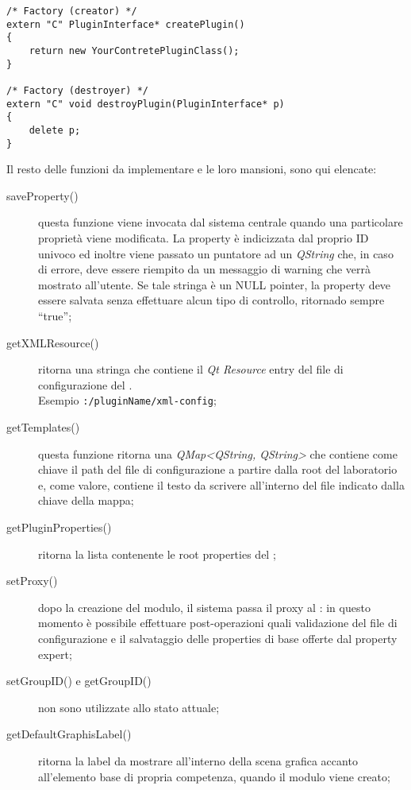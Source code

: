 \begin{lstlisting}
/* Factory (creator) */
extern "C" PluginInterface* createPlugin()
{
	return new YourContretePluginClass();
}

/* Factory (destroyer) */
extern "C" void destroyPlugin(PluginInterface* p)
{
	delete p;
}
\end{lstlisting}
Il resto delle funzioni da implementare e le loro mansioni, sono qui elencate:
\begin{description}
\item[saveProperty()] questa funzione viene invocata dal sistema centrale quando una particolare proprietà viene modificata. La property è indicizzata dal proprio ID univoco ed inoltre viene passato un puntatore ad un \emph{QString} che, in caso di errore, deve essere riempito da un messaggio di warning che verrà mostrato all'utente. Se tale stringa è un NULL pointer, la property deve essere salvata senza effettuare alcun tipo di controllo, ritornado sempre ``true'';

\item[getXMLResource()] ritorna una stringa che contiene il \emph{Qt Resource} entry del file di configurazione del \plugin{}. \\
Esempio \texttt{:/pluginName/xml-config};

\item[getTemplates()] questa funzione ritorna una \emph{QMap<QString, QString>} che contiene come chiave il path del file di configurazione a partire dalla root del laboratorio e, come valore, contiene il testo da scrivere all'interno del file indicato dalla chiave della mappa;

\item[getPluginProperties()] ritorna la lista contenente le root properties del \plugin{};

\item[setProxy()] dopo la creazione del modulo, il sistema passa il proxy al \plugin{}: in questo momento è possibile effettuare post-operazioni quali validazione del file \xml{} di configurazione e il salvataggio delle properties di base offerte dal property expert; 

\item[setGroupID() e getGroupID()] non sono utilizzate allo stato attuale;

\item[getDefaultGraphisLabel()] ritorna la label da mostrare all'interno della scena grafica accanto all'elemento base di propria competenza, quando il modulo viene creato;


\end{description}
